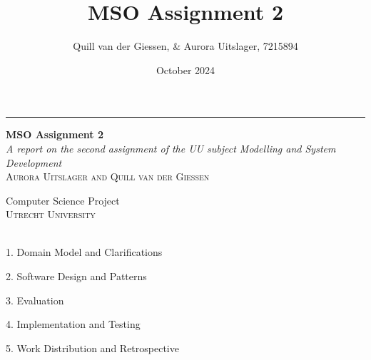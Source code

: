 \documentclass[a4paper, 11pt, oneside]{book} %
\title{MSO Assignment 2}
\author{Quill van der Giessen, \& Aurora Uitslager, 7215894}
\date{October 2024}
\begin{document}
\begin{titlepage} %
	
	\raggedleft %
	
	\rule{1pt}{\textheight} %
	\hspace{0.05\textwidth} %
	\parbox[b]{0.75\textwidth}{ %
		
		{\Huge \bfseries MSO Assignment 2}\\[2\baselineskip] %
		{\large\textit{A report on the second assignment of the UU subject Modelling and System Development}}\\[4\baselineskip] %
		{\Large\textsc{Aurora Uitslager and Quill van der Giessen}} %
		
		\vspace{0.5\textheight} %
		
		{\noindent \small Computer Science Project \\ \large \textsc{Utrecht University}~~\\}\\[\baselineskip] %
	}

\end{titlepage}

{1. Domain Model and Clarifications}

{2. Software Design and Patterns}

{3. Evaluation}

{4. Implementation and Testing}

{5. Work Distribution and Retrospective}
\end{document}
